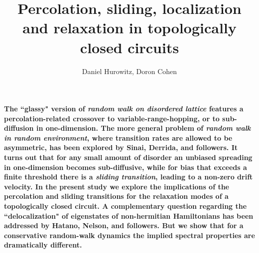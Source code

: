 \documentclass[aps,pre,floats,floatfix,twocolumn]{revtex4}
\begin{document}
 
\title{Percolation, sliding, localization and relaxation in topologically closed circuits}

\author{Daniel Hurowitz, Doron Cohen}



\maketitle

{\bf
The ``glassy" version of {\em random walk on disordered lattice}  
features a percolation-related crossover to variable-range-hopping,
or to sub-diffusion in one-dimension.  
The more general problem of {\em random walk in random environment}, 
where transition rates are allowed to be asymmetric, 
has been explored by Sinai, Derrida, and followers.  
It turns out that for any small amount of disorder 
an unbiased spreading in one-dimension becomes sub-diffusive,  
while for bias that exceeds a finite threshold there 
is a {\em sliding transition}, leading to a non-zero drift velocity.
%
In the present study we explore the implications of the percolation and sliding transitions 
for the relaxation modes of a topologically closed circuit. 
A complementary question regarding  the ``delocalization" of eigenstates 
of non-hermitian Hamiltonians has been addressed by Hatano, Nelson, and followers. 
But we show that for a conservative random-walk dynamics 
the implied spectral properties are dramatically different.
}
\end{document}

